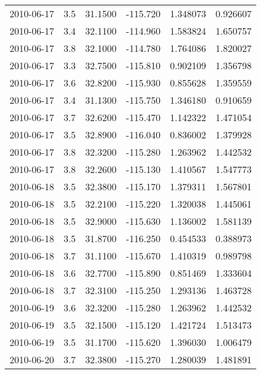 \begin{tabular}{lrrrrr}
2010-06-17 &       3.5 &  31.1500 &  -115.720 &         1.348073 &         0.926607 \\
2010-06-17 &       3.4 &  32.1100 &  -114.960 &         1.583824 &         1.650757 \\
2010-06-17 &       3.8 &  32.1000 &  -114.780 &         1.764086 &         1.820027 \\
2010-06-17 &       3.3 &  32.7500 &  -115.810 &         0.902109 &         1.356798 \\
2010-06-17 &       3.6 &  32.8200 &  -115.930 &         0.855628 &         1.359559 \\
2010-06-17 &       3.4 &  31.1300 &  -115.750 &         1.346180 &         0.910659 \\
2010-06-17 &       3.7 &  32.6200 &  -115.470 &         1.142322 &         1.471054 \\
2010-06-17 &       3.5 &  32.8900 &  -116.040 &         0.836002 &         1.379928 \\
2010-06-17 &       3.8 &  32.3200 &  -115.280 &         1.263962 &         1.442532 \\
2010-06-17 &       3.8 &  32.2600 &  -115.130 &         1.410567 &         1.547773 \\
2010-06-18 &       3.5 &  32.3800 &  -115.170 &         1.379311 &         1.567801 \\
2010-06-18 &       3.5 &  32.2100 &  -115.220 &         1.320038 &         1.445061 \\
2010-06-18 &       3.5 &  32.9000 &  -115.630 &         1.136002 &         1.581139 \\
2010-06-18 &       3.5 &  31.8700 &  -116.250 &         0.454533 &         0.388973 \\
2010-06-18 &       3.7 &  31.1100 &  -115.670 &         1.410319 &         0.989798 \\
2010-06-18 &       3.6 &  32.7700 &  -115.890 &         0.851469 &         1.333604 \\
2010-06-18 &       3.7 &  32.3100 &  -115.250 &         1.293136 &         1.463728 \\
2010-06-19 &       3.6 &  32.3200 &  -115.280 &         1.263962 &         1.442532 \\
2010-06-19 &       3.5 &  32.1500 &  -115.120 &         1.421724 &         1.513473 \\
2010-06-19 &       3.5 &  31.1700 &  -115.620 &         1.396030 &         1.006479 \\
2010-06-20 &       3.7 &  32.3800 &  -115.270 &         1.280039 &         1.481891 \\

\end{tabular}

